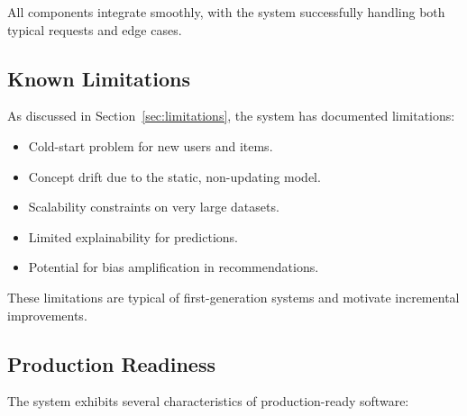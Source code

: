 All components integrate smoothly, with the system successfully handling both typical requests and edge cases.

\subsection{Known Limitations}

As discussed in Section~\ref{sec:limitations}, the system has documented limitations:

\begin{itemize}
  \item Cold-start problem for new users and items.
  
  \item Concept drift due to the static, non-updating model.
  
  \item Scalability constraints on very large datasets.
  
  \item Limited explainability for predictions.
  
  \item Potential for bias amplification in recommendations.
\end{itemize}

These limitations are typical of first-generation systems and motivate incremental improvements.

\subsection{Production Readiness}

The system exhibits several characteristics of production-ready software:

